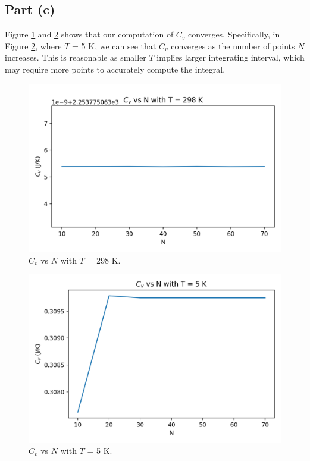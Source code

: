 \documentclass[11pt]{article}
\begin{document}
\subsection{Part (c)}
Figure \ref{fig:C_v-N_T298} and \ref{fig:C_v-N_T5} shows that our computation of $C_v$ converges. Specifically, in Figure \ref{fig:C_v-N_T5}, where $T$ = 5 K, we can see that $C_v$ converges as the number of points $N$ increases. This is reasonable as smaller $T$ implies larger integrating interval, which may require more points to accurately compute the integral.
\begin{figure}[H]
    \centering
    \includegraphics[scale = 1.0]{images/ps-4-1c_T298.png}
    \caption{$C_v$ vs $N$ with $T$ = 298 K.}
    \label{fig:C_v-N_T298}
\end{figure}
\begin{figure}[H]
    \centering
    \includegraphics[scale = 1.0]{images/ps-4-1c_T5.png}
    \caption{$C_v$ vs $N$ with $T$ = 5 K.}
    \label{fig:C_v-N_T5}
\end{figure}
\end{document}
